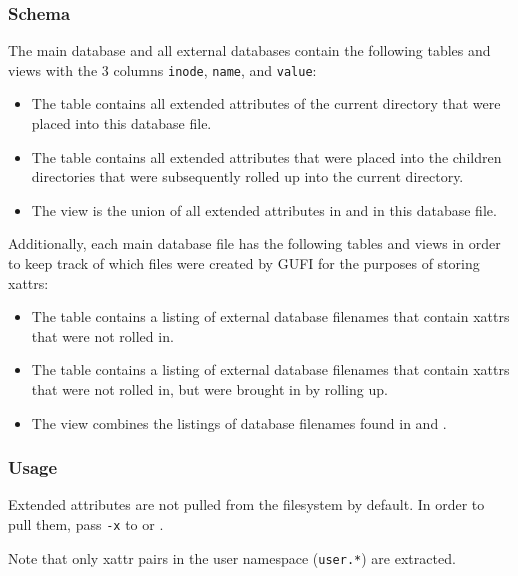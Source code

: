 \subsubsection{Schema}
\label{sec:xattr_schema}
The main database and all external databases contain the following
tables and views with the 3 columns \texttt{inode}, \texttt{name}, and
\texttt{value}:

\begin{itemize}
\item The \xattrspwd table contains all extended attributes of the
  current directory that were placed into this database file.

\item The \xattrsrollup table contains all extended attributes that
  were placed into the children directories that were subsequently
  rolled up into the current directory.

\item The \xattrsavail view is the union of all extended attributes
  in \xattrspwd and \xattrsrollup in this database file.
\end{itemize}

Additionally, each main database file has the following tables and
views in order to keep track of which files were created by GUFI for
the purposes of storing xattrs:

\begin{itemize}
\item The \xattrfilespwd table contains a listing of external database
  filenames that contain xattrs that were not rolled in.
\item The \xattrfilesrollup table contains a listing of external
  database filenames that contain xattrs that were not
  rolled in, but were brought in by rolling up.
\item The \xattrfiles view combines the listings of database filenames
  found in \xattrfilespwd and \xattrfilesrollup.
\end{itemize}

\subsubsection{Usage}
Extended attributes are not pulled from the filesystem by default. In
order to pull them, pass \texttt{-x} to \gufidirindex or
\gufidirtrace.

Note that only xattr pairs in the user namespace (\texttt{user.*}) are
extracted.
